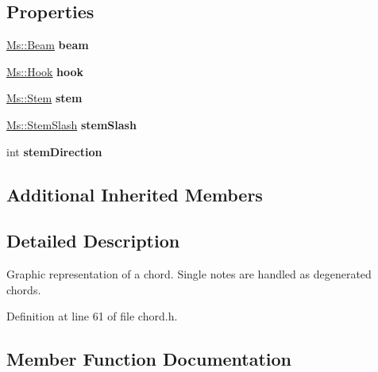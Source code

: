\subsection*{Properties}
\begin{DoxyCompactItemize}
\item 
\mbox{\label{class_ms_1_1_chord_aaff24b6a5ee42a7a303f404b02e3a72d}} 
\hyperlink{class_ms_1_1_beam}{Ms\+::\+Beam} {\bfseries beam}
\item 
\mbox{\label{class_ms_1_1_chord_abeb843a9d01fd33839d9a979aa836310}} 
\hyperlink{class_ms_1_1_hook}{Ms\+::\+Hook} {\bfseries hook}
\item 
\mbox{\label{class_ms_1_1_chord_ac7b80fdee60ff1462f41485f95f6fa3b}} 
\hyperlink{class_ms_1_1_stem}{Ms\+::\+Stem} {\bfseries stem}
\item 
\mbox{\label{class_ms_1_1_chord_a64eeb8602eb2f0832746fbbba25a7425}} 
\hyperlink{class_ms_1_1_stem_slash}{Ms\+::\+Stem\+Slash} {\bfseries stem\+Slash}
\item 
\mbox{\label{class_ms_1_1_chord_a87dddcb16332a25d17342017fae74de5}} 
int {\bfseries stem\+Direction}
\end{DoxyCompactItemize}
\subsection*{Additional Inherited Members}


\subsection{Detailed Description}
Graphic representation of a chord. Single notes are handled as degenerated chords. 

Definition at line 61 of file chord.\+h.



\subsection{Member Function Documentation}
\mbox{\label{class_ms_1_1_chord_ac91b212e92e0840f3ffd4f4751af8a39}} 
